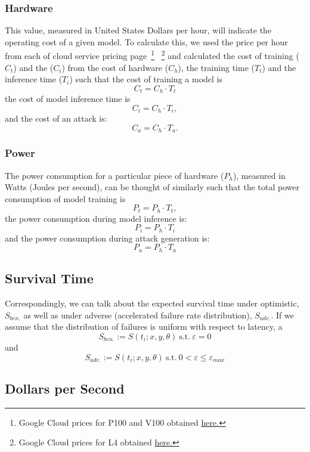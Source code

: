 \documentclass[conference]{IEEEtran}
\begin{document}
\subsubsection{Hardware}
This value, measured in United States Dollars per hour, will indicate the operating cost of a given model. To calculate this, we used the price per hour from each of cloud service pricing page~\footnote{ Google Cloud prices for P100 and V100 obtained \href{https://cloud.google.com/compute/gpus-pricing}{here.} } ~\footnote{Google Cloud prices for L4 obtained  \href{https://cloud.google.com/compute/vm-instance-pricing#accelerator-optimized}{here.}} and calculated the cost of training ($C_{t}$) and the ($C_{i}$) from the cost of hardware ($C_{h}$), the training time ($T_{t}$) and the inference time ($T_{i}$) such that the cost of training a model is
$$
    C_t = C_h \cdot T_t
    \label{eq:cost_training}
$$
the cost of model inference time is
$$
    C_i = C_h \cdot T_i,
    \label{eq:cost_inference}
$$
and the cost of an attack is:
$$
    C_a = C_h \cdot  T_a.
    \label{eq:cost_attack}
$$

\subsubsection{Power}
The power consumption for a particular piece of hardware ($P_h$), measured in Watts (Joules per second), can be thought of similarly such that the total power consumption of model training is
$$
    P_t = P_h \cdot T_t,
    \label{eq:cost_training}
$$
the power consumption during model inference is:
$$
    P_i = P_h \cdot T_i
    \label{eq:cost_inference}
$$
and the power consumption during attack generation is:
$$
    P_a = P_h \cdot T_a
$$

\subsection{Survival Time}
Correspondingly, we can talk about the expected survival time under optimistic, $S_{ben.}$ as well as under adverse (accelerated failure rate distribution), $S_{adv.}$. If we assume that the distribution of failures is uniform with respect to latency, a
$$
S_{ben.} := S(t_i; x, y, \theta) \mathrm{~s.t.~} \varepsilon = 0
$$
and
$$
S_{adv.} :=  S(t_i; x, y, \theta) \mathrm{~s.t.~} 0 < \varepsilon \leq \varepsilon_{max}
$$
\subsection{Dollars per Second}
\end{document}
